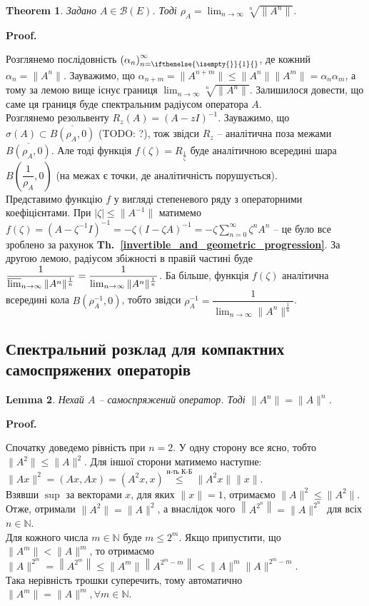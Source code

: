 \documentclass[a4paper, 10pt]{article}
\makeatletter
\theoremstyle{theoremdd}
\newtheorem{theorem}{Theorem}[subsection]
\theoremstyle{theoremdd}
\theoremstyle{theoremdd}
\theoremstyle{theoremdd}
\theoremstyle{theoremdd}
\theoremstyle{theoremdd}
\theoremstyle{theoremdd}
\newtheorem{lemma}[theorem]{Lemma}
\theoremstyle{theoremdd}
\newcommand\thref[1]{\textbf{Th.~\ref{#1}}}
\newcommand{\sequence}[2][]{\left({#2}\right)_{n=\ifthenelse{\isempty{#1}}{1}{#1}}^{\infty}}
\renewenvironment{proof}[1][Proof.\\]{\par
\pushQED{\hfill \qed}%
\normalfont \topsep6\p@\@plus6\p@\relax
\trivlist
\item\relax
{\bfseries
#1\@addpunct{.}}\hspace\labelsep\ignorespaces
}{%
\popQED\endtrivlist\@endpefalse
}
\makeatother
\begin{document}
\begin{theorem}
Задано $A \in \mathcal{B}(E)$. Тоді $\rho_A = \displaystyle\lim_{n \to \infty} \sqrt[n]{\|A^n\|}$.
\end{theorem}

\begin{proof}
Розглянемо послідовність $\sequence{\alpha_n}$, де кожний $\alpha_n = \|A^n\|$. Зауважимо, що $\alpha_{n+m} = \|A^{n+m}\| \leq \|A^n\| \|A^m\| = \alpha_n \alpha_m$, а тому за лемою вище існує границя $\displaystyle\lim_{n \to \infty} \sqrt[n]{\|A^n\|}$. Залишилося довести, що саме ця границя буде спектральним радіусом оператора $A$.\\
Розглянемо резольвенту $R_z(A) = (A-zI)^{-1}$. Зауважимо, що $\sigma(A) \subset \overline{B(\rho_A,0)}$ (TODO: ?), тож звідси $R_z$ -- аналітична поза межами $\overline{B(\rho_A,0)}$. Але тоді функція $f(\zeta) = R_{\frac{1}{\zeta}}$ буде аналітичною всередині шара $B\left(\dfrac{1}{\rho_A},0\right)$ (на межах є точки, де аналітичність порушується).\\
Представимо функцію $f$ у вигляді степеневого ряду з операторними коефіцієнтами. При $|\zeta| \leq \|A^{-1}\|$ матимемо $f(\zeta) = (A - \zeta^{-1}I)^{-1} = -\zeta(I - \zeta A)^{-1} = -\zeta \displaystyle\sum_{n=0}^\infty \zeta^n A^n$ -- це було все зроблено за рахунок \thref{invertible_and_geometric_progression}. За другою лемою, радіусом збіжності в правій частині буде $\dfrac{1}{\varlimsup_{n \to \infty} \|A^n\|^{\frac{1}{n}}} = \dfrac{1}{\lim_{n \to \infty} \|A^n\|^{\frac{1}{n}}}$. Ба більше, функція $f(\zeta)$ аналітична всередині кола $B(\rho_A^{-1},0)$, тобто звідси $\rho_A^{-1} = \dfrac{1}{\lim_{n \to \infty} \|A^n\|^{\frac{1}{n}}}$.
\end{proof}

\subsection{Спектральний розклад для компактних самоспряжених операторів}
\begin{lemma}
Нехай $A$ -- самоспряжений оператор. Тоді $\|A^n\| = \|A\|^n$.
\end{lemma}

\begin{proof}
Спочатку доведемо рівність при $n = 2$. У одну сторону все ясно, тобто $\|A^2\| \leq \|A\|^2$. Для іншої сторони матимемо наступне:\\
$\|Ax\|^2 = (Ax,Ax) = (A^2x,x) \overset{\text{н-ть К-Б}}{\leq} \|A^2x\| \|x\|$.\\
Взявши $\sup$ за векторами $x$, для яких $\|x\| = 1$, отримаємо $\|A\|^2 \leq \|A^2\|$.\\
Отже, отримали $\|A^2\| = \|A\|^2$, а внаслідок чого $\left\|A^{2^n}\right\| = \|A\|^{2^n}$ для всіх $n \in \mathbb{N}$.\\
Для кожного числа $m \in \mathbb{N}$ буде $m \leq 2^m$. Якщо припустити, що $\|A^m\| < \|A\|^m$, то отримаємо\\
$\|A\|^{2^m} = \left\|A^{2^m}\right\| \leq \|A^m\| \left\| A^{2^m -m} \right\| < \|A\|^m \|A\|^{2^m - m}$.\\
Така нерівність трошки суперечить, тому автоматично $\|A^m\| = \|A\|^m, \forall m \in \mathbb{N}$.
\end{proof}
\end{document}
